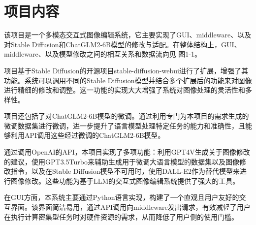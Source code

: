 \documentclass[a4paper,AutoFakeBold,oneside,12pt]{book}
\begin{document}
\section{项目内容}







该项目是一个多模态交互式图像编辑系统，它主要实现了GUI、middleware、以及对Stable Diffusion和ChatGLM2-6B模型的修改与适配。在整体结构上，GUI、middleware、以及模型修改之间的相互关系和数据流向见 图1-1。

项目基于Stable Diffusion的开源项目stable-diffusion-webui进行了扩展，增强了其功能。系统可以调用不同的Stable Diffusion模型并结合多个扩展后的功能来对图像进行精细的修改和调整。这一功能的实现大大增强了系统对图像处理的灵活性和多样性。

项目还包括了对ChatGLM2-6B模型的微调。通过利用专门为本项目的需求生成的微调数据集进行微调，进一步提升了语言模型处理特定任务的能力和准确性，且能够利用API调用这些经过微调的ChatGLM2-6B模型。

通过调用OpenAI的API，本项目实现了多项功能：利用GPT4V生成关于图像修改的建议，使用GPT3.5Turbo来辅助生成用于微调大语言模型的数据集以及图像修改指令，以及在Stable Diffusion模型不可用时，使用DALL-E2作为替代模型来进行图像修改。这些功能为基于LLM的交互式图像编辑系统提供了强大的工具。

在GUI方面，本系统主要通过Python语言实现，构建了一个直观且用户友好的交互界面。该界面简洁易用，通过API调用向middleware发出请求，有效减轻了用户在执行计算密集型任务时对硬件资源的需求，从而降低了用户侧的使用门槛。
\end{document}
